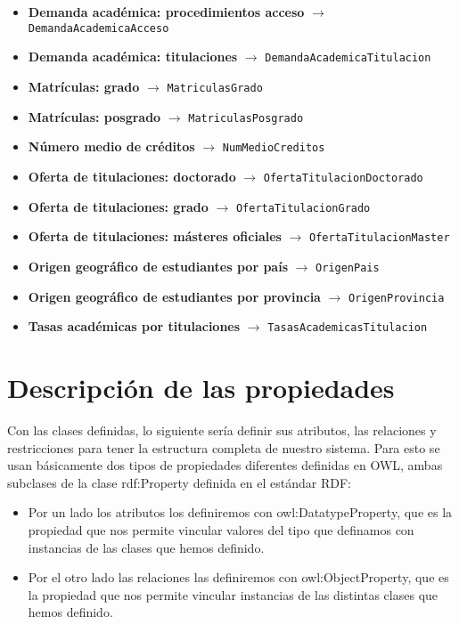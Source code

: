 \begin{itemize}
	\item \textbf{Demanda académica: procedimientos acceso} $\rightarrow$ {\tt DemandaAcademicaAcceso}
	\item \textbf{Demanda académica: titulaciones} $\rightarrow$ {\tt DemandaAcademicaTitulacion}
	\item \textbf{Matrículas: grado} $\rightarrow$ {\tt MatriculasGrado}
	\item \textbf{Matrículas: posgrado} $\rightarrow$ {\tt MatriculasPosgrado}
	\item \textbf{Número medio de créditos} $\rightarrow$ {\tt NumMedioCreditos}
	\item \textbf{Oferta de titulaciones: doctorado} $\rightarrow$ {\tt OfertaTitulacionDoctorado}
	\item \textbf{Oferta de titulaciones: grado} $\rightarrow$ {\tt OfertaTitulacionGrado}
	\item \textbf{Oferta de titulaciones: másteres oficiales} $\rightarrow$ {\tt OfertaTitulacionMaster}
	\item \textbf{Origen geográfico de estudiantes por país} $\rightarrow$ {\tt OrigenPais}
	\item \textbf{Origen geográfico de estudiantes por provincia} $\rightarrow$ {\tt OrigenProvincia}
	\item \textbf{Tasas académicas por titulaciones} $\rightarrow$ {\tt TasasAcademicasTitulacion}
\end{itemize}

\section{Descripción de las propiedades}

Con las clases definidas, lo siguiente sería definir sus atributos, las relaciones y restricciones para tener la estructura completa de nuestro sistema. Para esto se usan básicamente dos tipos de propiedades diferentes definidas en OWL, ambas subclases de la clase rdf:Property definida en el estándar RDF:

\begin{itemize}
	\item Por un lado los atributos los definiremos con owl:DatatypeProperty, que es la propiedad que nos permite vincular valores del tipo que definamos con instancias de las clases que hemos definido.
	\item Por el otro lado las relaciones las definiremos con owl:ObjectProperty, que es la propiedad que nos permite vincular instancias de las distintas clases que hemos definido.
\end{itemize}

